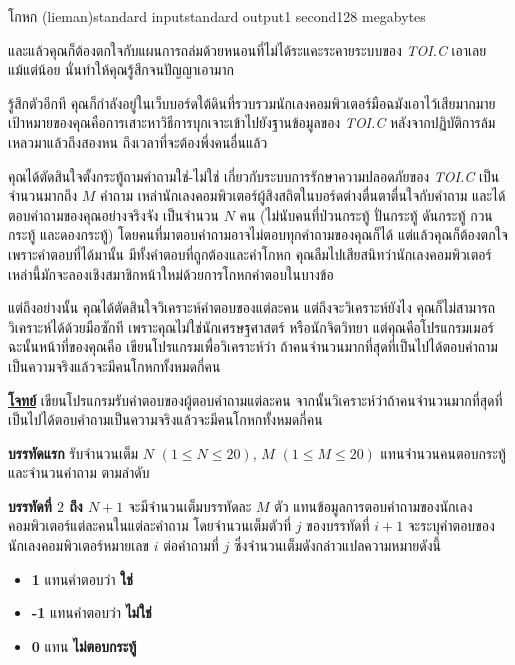 \documentclass[11pt,a4paper]{article}
\begin{document}
\begin{problem}{โกหก (lieman)}{standard input}{standard output}{1 second}{128 megabytes}

 และแล้วคุณก็ต้องตกใจกับแผนการถล่มด้วยหนอนที่ไม่ได้ระแคะระคายระบบของ\textit{ TOI.C }เอาเลยแม้แต่น้อย นั่นทำให้คุณรู้สึกจนปัญญาเอามาก

รู้สึกตัวอีกที คุณก็กำลังอยู่ในเว็บบอร์ดใต้ดินที่รวบรวมนักเลงคอมพิวเตอร์มือฉมังเอาไว้เสียมากมาย เป้าหมายของคุณคือการเสาะหาวิธีการบุกเจาะเข้าไปยังฐานข้อมูลของ \textit{TOI.C} หลังจากปฏิบัติการล้มเหลวมาแล้วถึงสองหน ถึงเวลาที่จะต้องพึ่งคนอื่นแล้ว

คุณได้ตัดสินใจตั้งกระทู้ถามคำถามใช่-ไม่ใช่ เกี่ยวกับระบบการรักษาความปลอดภัยของ\textit{ TOI.C} เป็นจำนวนมากถึง $M$ คำถาม เหล่านักเลงคอมพิวเตอร์ผู้สิงสถิตในบอร์ดต่างตื่นตาตื่นใจกับคำถาม และได้ตอบคำถามของคุณอย่างจริงจัง เป็นจำนวน $N$ คน (ไม่นับคนที่ป่วนกระทู้ ปั่นกระทู้ ดันกระทู้ กวนกระทู้ และดองกระทู้) โดยคนที่มาตอบคำถามอาจไม่ตอบทุกคำถามของคุณก็ได้ แต่แล้วคุณก็ต้องตกใจ เพราะคำตอบที่ได้มานั้น มีทั้งคำตอบที่ถูกต้องและคำโกหก คุณลืมไปเสียสนิทว่านักเลงคอมพิวเตอร์เหล่านี้มักจะลองเชิงสมาชิกหน้าใหม่ด้วยการโกหกคำตอบในบางข้อ

แต่ถึงอย่างนั้น คุณได้ตัดสินใจวิเคราะห์คำตอบของแต่ละคน แต่ถึงจะวิเคราะห์ยังไง คุณก็ไม่สามารถวิเคราะห์ได้ด้วยมือซักที เพราะคุณไม่ใช่นักเศรษฐศาสตร์ หรือนักจิตวิทยา แต่คุณคือโปรแกรมเมอร์ ฉะนั้นหน้าที่ของคุณคือ เขียนโปรแกรมเพื่อวิเคราะห์ว่า ถ้าคนจำนวนมากที่สุดที่เป็นไปได้ตอบคำถามเป็นความจริงแล้วจะมีคนโกหกทั้งหมดกี่คน

\bigskip
\underline{\textbf{โจทย์}}  เขียนโปรแกรมรับคำตอบของผู้ตอบคำถามแต่ละคน จากนั้นวิเคราะห์ว่าถ้าคนจำนวนมากที่สุดที่เป็นไปได้ตอบคำถามเป็นความจริงแล้วจะมีคนโกหกทั้งหมดกี่คน

\InputFile

\textbf{บรรทัดแรก} รับจำนวนเต็ม $N$ $(1 \leq N \leq 20)$, $M$ $(1 \leq M \leq 20)$ แทนจำนวนคนตอบกระทู้ และจำนวนคำถาม ตามลำดับ

\textbf{บรรทัดที่ $2$ ถึง $N+1$} จะมีจำนวนเต็มบรรทัดละ $M$ ตัว แทนข้อมูลการตอบคำถามของนักเลงคอมพิวเตอร์แต่ละคนในแต่ละคำถาม โดยจำนวนเต็มตัวที่ $j$ ของบรรทัดที่ $i + 1$ จะระบุคำตอบของนักเลงคอมพิวเตอร์หมายเลข $i$ ต่อคำถามที่ $j$ ซึ่งจำนวนเต็มดังกล่าวแปลความหมายดังนี้

\begin{itemize}

\item \textbf{1} แทนคำตอบว่า \textbf{ใช่}
\item \textbf{-1} แทนคำตอบว่า \textbf{ไม่ใช่}
\item \textbf{0 }แทน \textbf{ไม่ตอบกระทู้}
\end{itemize}


\end{problem}
\end{document}
